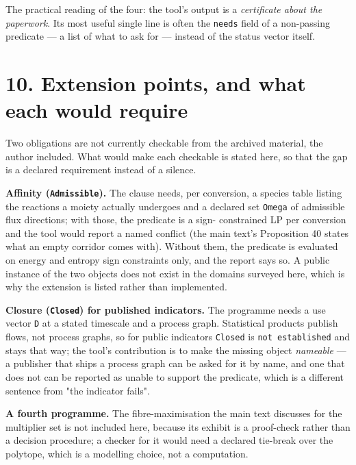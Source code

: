 \documentclass[11pt]{article}
\begin{document}
The practical reading of the four: the tool's output is a \emph{certificate about the paperwork}. Its most useful single line is often the \texttt{needs} field of a non-passing predicate --- a list of what to ask for --- instead of the status vector itself.

\vspace{0.8em}

\section*{10. Extension points, and what each would require}\label{10-extension-points-and-what-each-would-require}

Two obligations are not currently checkable from the archived material, the author included. What would make each checkable is stated here, so that the gap is a declared requirement instead of a silence.

\textbf{Affinity (\texttt{Admissible}).} The clause needs, per conversion, a species table listing the reactions a moiety actually undergoes and a declared set \texttt{Omega} of admissible flux directions; with those, the predicate is a sign- constrained LP per conversion and the tool would report a named conflict (the main text's Proposition 40 states what an empty corridor comes with). Without them, the predicate is evaluated on energy and entropy sign constraints only, and the report says so. A public instance of the two objects does not exist in the domains surveyed here, which is why the extension is listed rather than implemented.

\textbf{Closure (\texttt{Closed}) for published indicators.} The programme needs a use vector \texttt{D} at a stated timescale and a process graph. Statistical products publish flows, not process graphs, so for public indicators \texttt{Closed} is \texttt{not establis\allowbreak{}hed} and stays that way; the tool's contribution is to make the missing object \emph{nameable} --- a publisher that ships a process graph can be asked for it by name, and one that does not can be reported as unable to support the predicate, which is a different sentence from "the indicator fails".

\textbf{A fourth programme.} The fibre-maximisation the main text discusses for the multiplier set is not included here, because its exhibit is a proof-check rather than a decision procedure; a checker for it would need a declared tie-break over the polytope, which is a modelling choice, not a computation.
\end{document}

